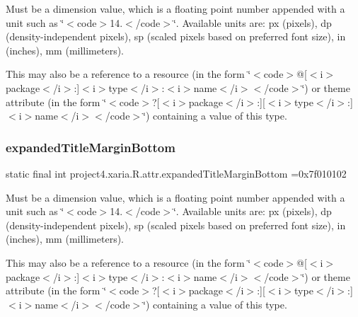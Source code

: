 Must be a dimension value, which is a floating point number appended with a unit such as \char`\"{}$<$code$>$14.\+5sp$<$/code$>$\char`\"{}. Available units are\+: px (pixels), dp (density-\/independent pixels), sp (scaled pixels based on preferred font size), in (inches), mm (millimeters). 

This may also be a reference to a resource (in the form \char`\"{}$<$code$>$@\mbox{[}$<$i$>$package$<$/i$>$\+:\mbox{]}$<$i$>$type$<$/i$>$\+:$<$i$>$name$<$/i$>$$<$/code$>$\char`\"{}) or theme attribute (in the form \char`\"{}$<$code$>$?\mbox{[}$<$i$>$package$<$/i$>$\+:\mbox{]}\mbox{[}$<$i$>$type$<$/i$>$\+:\mbox{]}$<$i$>$name$<$/i$>$$<$/code$>$\char`\"{}) containing a value of this type. \mbox{\label{classproject4_1_1xaria_1_1R_1_1attr_a72f3397781eabdf07e78f61d1021fa0d}} 
\subsubsection{\texorpdfstring{expanded\+Title\+Margin\+Bottom}{expandedTitleMarginBottom}}
{\footnotesize\ttfamily static final int project4.\+xaria.\+R.\+attr.\+expanded\+Title\+Margin\+Bottom =0x7f010102\hspace{0.3cm}{\ttfamily [static]}}

Must be a dimension value, which is a floating point number appended with a unit such as \char`\"{}$<$code$>$14.\+5sp$<$/code$>$\char`\"{}. Available units are\+: px (pixels), dp (density-\/independent pixels), sp (scaled pixels based on preferred font size), in (inches), mm (millimeters). 

This may also be a reference to a resource (in the form \char`\"{}$<$code$>$@\mbox{[}$<$i$>$package$<$/i$>$\+:\mbox{]}$<$i$>$type$<$/i$>$\+:$<$i$>$name$<$/i$>$$<$/code$>$\char`\"{}) or theme attribute (in the form \char`\"{}$<$code$>$?\mbox{[}$<$i$>$package$<$/i$>$\+:\mbox{]}\mbox{[}$<$i$>$type$<$/i$>$\+:\mbox{]}$<$i$>$name$<$/i$>$$<$/code$>$\char`\"{}) containing a value of this type. \mbox{\label{classproject4_1_1xaria_1_1R_1_1attr_a0fd32699f56df0a95c23fad85b1d897e}} 
